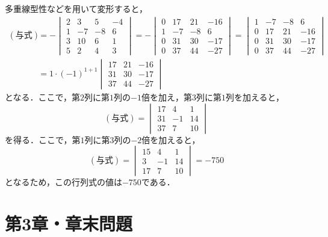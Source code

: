 \begin{tanswer}
  多重線型性などを用いて変形すると，
  \begin{align*}
    (\text{与式}) & = -
    \begin{vmatrix}
      2 & 3  & 5  & -4 \\
      1 & -7 & -8 & 6  \\
      3 & 10 & 6  & 1  \\
      5 & 2  & 4  & 3
    \end{vmatrix}
    = -
    \begin{vmatrix}
      0 & 17 & 21 & -16 \\
      1 & -7 & -8 & 6   \\
      0 & 31 & 30 & -17 \\
      0 & 37 & 44 & -27
    \end{vmatrix}
    =
    \begin{vmatrix}
      1 & -7 & -8 & 6   \\
      0 & 17 & 21 & -16 \\
      0 & 31 & 30 & -17 \\
      0 & 37 & 44 & -27
    \end{vmatrix}
    \\
                & = 1 \cdot (-1)^{1+1}
    \begin{vmatrix}
      17 & 21 & -16 \\
      31 & 30 & -17 \\
      37 & 44 & -27
    \end{vmatrix}
  \end{align*}
  となる．ここで，第$2$列に第$1$列の$-1$倍を加え，第$3$列に第$1$列を加えると，
  \[
    (\text{与式}) =
    \begin{vmatrix}
      17 & 4  & 1  \\
      31 & -1 & 14 \\
      37 & 7  & 10
    \end{vmatrix}
  \]
  を得る．ここで，第$1$列に第$3$列の$-2$倍を加えると，
  \[
    (\text{与式})=
    \begin{vmatrix}
      15 & 4  & 1  \\
      3  & -1 & 14 \\
      17 & 7  & 10
    \end{vmatrix}
    = -750
  \]
  となるため，この行列式の値は$-750$である．
\end{tanswer}


\part*{第3章・章末問題}


